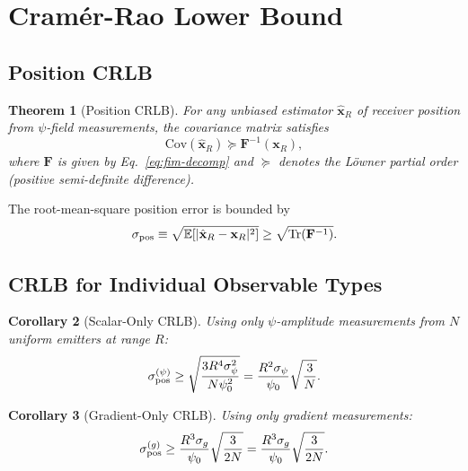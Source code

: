\documentclass[twocolumn,superscriptaddress,prd,nofootinbib]{revtex4-2}
\newcommand{\FIM}{\mathbf{F}}
\newcommand{\xvec}{\mathbf{x}}
\DeclareMathOperator{\Tr}{Tr}
\newtheorem{theorem}{Theorem}
\newtheorem{corollary}[theorem]{Corollary}
\begin{document}
\section{Cram\'er-Rao Lower Bound}\label{sec:crlb}

\subsection{Position CRLB}

\begin{theorem}[Position CRLB]\label{thm:crlb}
For any unbiased estimator $\hat{\xvec}_R$ of receiver position from
$\psi$-field measurements, the covariance matrix satisfies
\begin{equation}
\boxed{
\mathrm{Cov}(\hat{\xvec}_R) \succeq \FIM^{-1}(\xvec_R),
}
\label{eq:crlb}
\end{equation}
where $\FIM$ is given by Eq.~\eqref{eq:fim-decomp} and $\succeq$
denotes the L\"owner partial order (positive semi-definite difference).
\end{theorem}

The root-mean-square position error is bounded by
\begin{equation}
\sigma_{\rm pos} \equiv \sqrt{\mathbb{E}[|\hat{\xvec}_R - \xvec_R|^2]}
\geq \sqrt{\Tr(\FIM^{-1})}.
\label{eq:sigma-pos}
\end{equation}

\subsection{CRLB for Individual Observable Types}

\begin{corollary}[Scalar-Only CRLB]\label{cor:scalar-crlb}
Using only $\psi$-amplitude measurements from $N$ uniform emitters at
range $R$:
\begin{equation}
\sigma_{\rm pos}^{(\psi)} \geq \sqrt{\frac{3R^4\sigma_\psi^2}{N\psi_0^2}}
= \frac{R^2\sigma_\psi}{\psi_0}\sqrt{\frac{3}{N}}.
\label{eq:crlb-scalar}
\end{equation}
\end{corollary}

\begin{corollary}[Gradient-Only CRLB]\label{cor:grad-crlb}
Using only gradient measurements:
\begin{equation}
\sigma_{\rm pos}^{(g)} \geq \frac{R^3\sigma_g}{\psi_0}\sqrt{\frac{3}{2N}}
= \frac{R^3\sigma_g}{\psi_0}\sqrt{\frac{3}{2N}}.
\label{eq:crlb-grad}
\end{equation}
\end{corollary}
\end{document}
